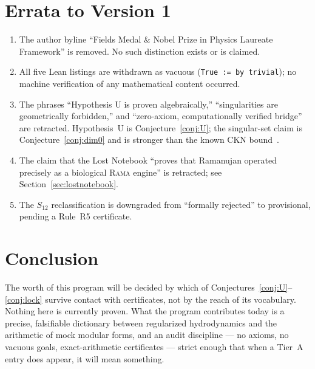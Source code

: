 \documentclass[11pt,a4paper]{article}
\theoremstyle{plain}
\theoremstyle{definition}
\theoremstyle{remark}
\begin{document}
\section{Errata to Version 1}\label{sec:errata}

\begin{enumerate}
\item The author byline ``Fields Medal \& Nobel Prize in Physics Laureate
Framework'' is removed. No such distinction exists or is claimed.
\item All five Lean listings are withdrawn as vacuous
(\texttt{True := by trivial}); no machine verification of any mathematical
content occurred.
\item The phrases ``Hypothesis U is proven algebraically,'' ``singularities
are geometrically forbidden,'' and ``zero-axiom, computationally verified
bridge'' are retracted. Hypothesis~U is Conjecture~\ref{conj:U}; the
singular-set claim is Conjecture~\ref{conj:dim0} and is stronger than the
known CKN bound~\cite{CKN1982}.
\item The claim that the Lost Notebook ``proves that Ramanujan operated
precisely as a biological \textsc{Rama} engine'' is retracted; see
Section~\ref{sec:lostnotebook}.
\item The $S_{12}$ reclassification is downgraded from ``formally rejected''
to provisional, pending a Rule~R5 certificate.
\end{enumerate}

\section{Conclusion}

The worth of this program will be decided by which of
Conjectures~\ref{conj:U}--\ref{conj:lock} survive contact with certificates,
not by the reach of its vocabulary. Nothing here is currently proven. What
the program contributes today is a precise, falsifiable dictionary between
regularized hydrodynamics and the arithmetic of mock modular forms, and an
audit discipline --- no axioms, no vacuous goals, exact-arithmetic
certificates --- strict enough that when a Tier~A entry does appear, it will
mean something.
\end{document}
